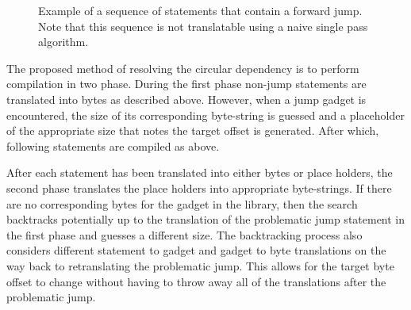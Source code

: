     \begin{figure}
        \centering
        \caption[Example of a sequence of statements that contain a forward
        jump.]{Example of a sequence of statements that contain a forward
        jump. Note that this sequence is not translatable using a naive single
        pass algorithm.}
        \label{fig:method-forward-jump}
    \end{figure}

    The proposed method of resolving the circular dependency is to perform
    compilation in two phase. During the first phase non-jump statements are
    translated into bytes as described above. However, when a jump gadget is
    encountered, the size of its corresponding byte-string is guessed and a
    placeholder of the appropriate size that notes the target offset is
    generated. After which, following statements are compiled as above.

    After each statement has been translated into either bytes or place holders,
    the second phase translates the place holders into appropriate byte-strings.
    If there are no corresponding bytes for the gadget in the library, then the
    search backtracks potentially up to the translation of the problematic jump
    statement in the first phase and guesses a different size. The backtracking
    process also considers different statement to gadget and gadget to byte
    translations on the way back to retranslating the problematic jump. This
    allows for the target byte offset to change without having to throw away all
    of the translations after the problematic jump.

